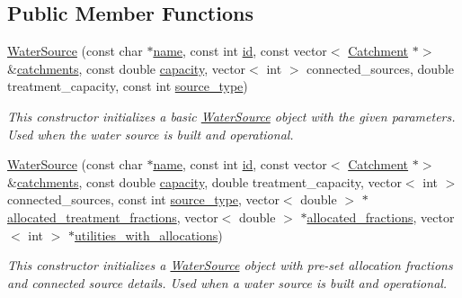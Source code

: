\subsection*{Public Member Functions}
\begin{DoxyCompactItemize}
\item 
\mbox{\hyperlink{classWaterSource_a27b9d29d6cbb36d128f740f7ca00f500}{Water\+Source}} (const char $\ast$\mbox{\hyperlink{classWaterSource_a846ea74c5b453d014f594d41fee8c765}{name}}, const int \mbox{\hyperlink{classWaterSource_a6eafe5dfefd317877d1244e8a7c6e742}{id}}, const vector$<$ \mbox{\hyperlink{classCatchment}{Catchment}} $\ast$$>$ \&\mbox{\hyperlink{classWaterSource_a8c18c34f23f8a06685c1d12f462ed830}{catchments}}, const double \mbox{\hyperlink{classWaterSource_a2ec257b415b248214a8bce7fc5267723}{capacity}}, vector$<$ int $>$ connected\+\_\+sources, double treatment\+\_\+capacity, const int \mbox{\hyperlink{classWaterSource_afdd12c29fc74ea21dff1f1be9b8c2b7b}{source\+\_\+type}})
\begin{DoxyCompactList}\small\item\em This constructor initializes a basic {\ttfamily \mbox{\hyperlink{classWaterSource}{Water\+Source}}} object with the given parameters. Used when the water source is built and operational. \end{DoxyCompactList}\item 
\mbox{\hyperlink{classWaterSource_a7723d343a0b8edff36018ca7acf09f62}{Water\+Source}} (const char $\ast$\mbox{\hyperlink{classWaterSource_a846ea74c5b453d014f594d41fee8c765}{name}}, const int \mbox{\hyperlink{classWaterSource_a6eafe5dfefd317877d1244e8a7c6e742}{id}}, const vector$<$ \mbox{\hyperlink{classCatchment}{Catchment}} $\ast$$>$ \&\mbox{\hyperlink{classWaterSource_a8c18c34f23f8a06685c1d12f462ed830}{catchments}}, const double \mbox{\hyperlink{classWaterSource_a2ec257b415b248214a8bce7fc5267723}{capacity}}, double treatment\+\_\+capacity, vector$<$ int $>$ connected\+\_\+sources, const int \mbox{\hyperlink{classWaterSource_afdd12c29fc74ea21dff1f1be9b8c2b7b}{source\+\_\+type}}, vector$<$ double $>$ $\ast$\mbox{\hyperlink{classWaterSource_aa73fe10cfc6579b2fb79529e1dde5140}{allocated\+\_\+treatment\+\_\+fractions}}, vector$<$ double $>$ $\ast$\mbox{\hyperlink{classWaterSource_a2f6655a80c4847fe039987255d9d998c}{allocated\+\_\+fractions}}, vector$<$ int $>$ $\ast$\mbox{\hyperlink{classWaterSource_ac345583fc2d0f7e1db31ee40244d7ace}{utilities\+\_\+with\+\_\+allocations}})
\begin{DoxyCompactList}\small\item\em This constructor initializes a {\ttfamily \mbox{\hyperlink{classWaterSource}{Water\+Source}}} object with pre-\/set allocation fractions and connected source details. Used when a water source is built and operational. \end{DoxyCompactList}\item 

\end{DoxyCompactItemize}
